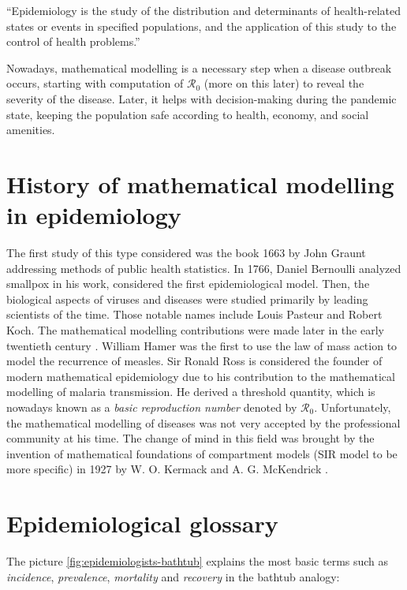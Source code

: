 \documentclass[
  digital, %
  oneside, %
  lof,     %
  lot,     %
]{fithesis4}
\begin{document}
\begin{displayquote}
  ``Epidemiology is the study of the distribution and
  determinants of health-related states or events in specified
  populations, and the application of this study to the control
  of health problems.''
\end{displayquote}

Nowadays, mathematical modelling is a necessary step when a disease outbreak occurs, starting with computation of $\mathcal{R}_0$ (more on this later) to reveal the severity of the disease.
Later, it helps with decision-making during the pandemic state, keeping the population safe according to health, economy, and social amenities.


\section{History of mathematical modelling in epidemiology}

The first study of this type considered was the book 1663 by John Graunt addressing methods of public health statistics.
In 1766, Daniel Bernoulli analyzed smallpox in his work, considered the first epidemiological model.
Then, the biological aspects of viruses and diseases were studied primarily by leading scientists of the time.
Those notable names include Louis Pasteur and Robert Koch.
The mathematical modelling contributions were made later in the early twentieth century \cite[Chapter~1.4]{martcheva2015}.
William Hamer was the first to use the law of mass action to model the recurrence of measles. 
Sir Ronald Ross is considered the founder of modern mathematical epidemiology due to his contribution to the mathematical modelling of malaria transmission.
He derived a threshold quantity, which is nowadays known as a \textit{basic reproduction number} denoted by $\mathcal{R}_0$.
Unfortunately, the mathematical modelling of diseases was not very accepted by the professional community at his time.
The change of mind in this field was brought by the invention of mathematical foundations of compartment models (SIR model to be more specific) in 1927 by W. O. Kermack and A. G. McKendrick \cite{kermack1927}.



\section{Epidemiological glossary}

The picture \ref{fig:epidemiologists-bathtub} explains the most basic terms such as \textit{incidence}, \textit{prevalence}, \textit{mortality} and \textit{recovery} in the bathtub analogy:
\end{document}
